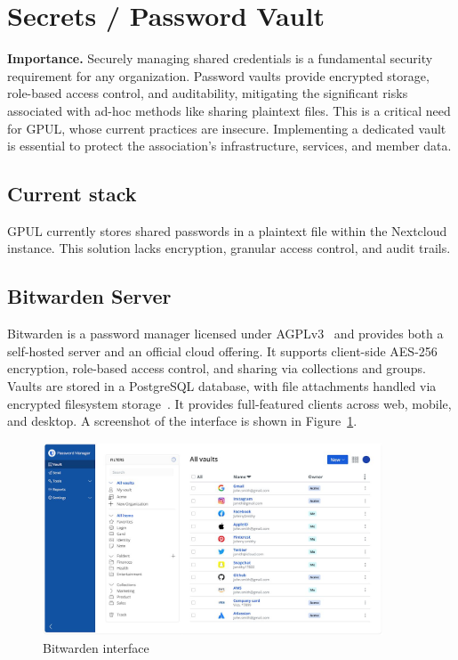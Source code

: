 \section{Secrets / Password Vault}

\textbf{Importance.} Securely managing shared credentials is a fundamental security requirement for any organization. Password vaults provide encrypted storage, role-based access control, and auditability, mitigating the significant risks associated with ad-hoc methods like sharing plaintext files. This is a critical need for GPUL, whose current practices are insecure. Implementing a dedicated vault is essential to protect the association's infrastructure, services, and member data.

\subsection*{Current stack}
GPUL currently stores shared passwords in a plaintext file within the Nextcloud instance. This solution lacks encryption, granular access control, and audit trails.

\subsection*{Bitwarden Server}
Bitwarden is a password manager licensed under AGPLv3~\cite{bitwarden-license} and provides both a self-hosted server and an official cloud offering. It supports client-side AES-256 encryption, role-based access control, and sharing via collections and groups. Vaults are stored in a PostgreSQL database, with file attachments handled via encrypted filesystem storage~\cite{bitwarden-groups}. It provides full-featured clients across web, mobile, and desktop. A screenshot of the interface is shown in Figure~\ref{fig:bitwarden-ui}.

\begin{figure}[H]
  \centering
  \includegraphics[width=0.9\textwidth]{imaxes/bitwarden-ui.png}
  \caption{Bitwarden interface}
  \label{fig:bitwarden-ui}
\end{figure}

